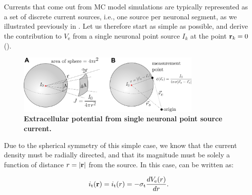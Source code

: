 \section{}
\label{sec:VC:pointsource}
Currents that come out from MC model simulations are typically represented as 
a set of discrete current sources, i.e., one source per neuronal segment, as we illustrated previously in . Let us therefore start as simple as possible, 
and derive the contribution to $V_\mathrm{e}$ from a single neuronal point source 
$I_{k}$ at the point ${\bf r}_k=0$ ().

\begin{figure}[!ht]
\begin{center}
\includegraphics[width=0.8\textwidth]{Figures/VC/EP_from_pointsource_illustration.png}
\end{center}
\caption{\textbf{Extracellular potential from single neuronal point source current.} 
}
\label{fig:VC:pointsource}
\end{figure}

Due to the spherical symmetry of this simple case, we know that the current density 
must be radially directed, and that its magnitude must be solely a function of distance $r = |{\bf r}|$ from the source.
In this case,  can be written as:

\begin{equation}
i_\mathrm{t}({\bf r}) = i_\mathrm{t}(r) = -\sigma_\mathrm{t} \frac{dV_\mathrm{e}(r)}{dr}.
\end{equation}

